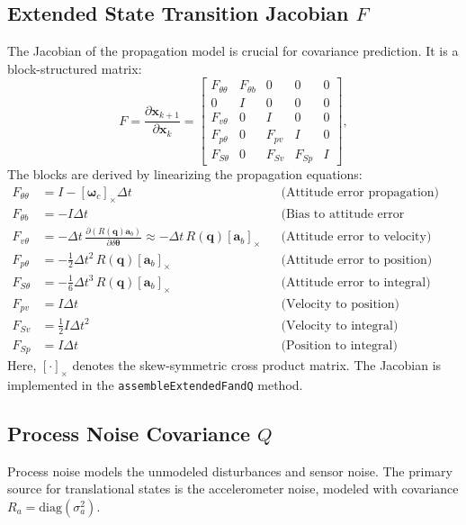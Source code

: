\documentclass[11pt,letterpaper]{article}
\begin{document}
\subsection{Extended State Transition Jacobian $F$}
\label{ssec:jacobian}
The Jacobian of the propagation model is crucial for covariance prediction. It is a block-structured matrix:
\begin{equation}
F = \frac{\partial \bm{x}_{k+1}}{\partial \bm{x}_{k}} = \begin{bmatrix}
F_{\theta\theta} & F_{\theta b} & 0 & 0 & 0 \\
0 & I & 0 & 0 & 0 \\
F_{v\theta} & 0 & I & 0 & 0 \\
F_{p\theta} & 0 & F_{pv} & I & 0 \\
F_{S\theta} & 0 & F_{Sv} & F_{Sp} & I
\end{bmatrix},
\end{equation}
The blocks are derived by linearizing the propagation equations:
\begin{align}
F_{\theta\theta} &= I - [\bm{\omega}_c]_\times \Delta t && \text{(Attitude error propagation)} \\
F_{\theta b} &= -I \Delta t && \text{(Bias to attitude error coupling)} \\
F_{v\theta} &= -\Delta t \, \frac{\partial (R(\bm{q})\bm{a}_b)}{\partial \delta\bm{\theta}} \approx -\Delta t \, R(\bm{q}) [\bm{a}_b]_\times && \text{(Attitude error to velocity)} \\
F_{p\theta} &= -\tfrac{1}{2}\Delta t^2 \, R(\bm{q}) [\bm{a}_b]_\times && \text{(Attitude error to position)} \\
F_{S\theta} &= -\tfrac{1}{6}\Delta t^3 \, R(\bm{q}) [\bm{a}_b]_\times && \text{(Attitude error to integral)} \\
F_{pv} &= I \Delta t && \text{(Velocity to position)} \\
F_{Sv} &= \tfrac{1}{2} I \Delta t^2 && \text{(Velocity to integral)} \\
F_{Sp} &= I \Delta t && \text{(Position to integral)}
\end{align}
Here, $[\cdot]_\times$ denotes the skew-symmetric cross product matrix. The Jacobian is implemented in the \texttt{assembleExtendedFandQ} method.

\subsection{Process Noise Covariance $Q$}
\label{ssec:processnoise}
Process noise models the unmodeled disturbances and sensor noise. The primary source for translational states is the accelerometer noise, modeled with covariance $R_a = \text{diag}(\sigma_a^2)$.
\end{document}
